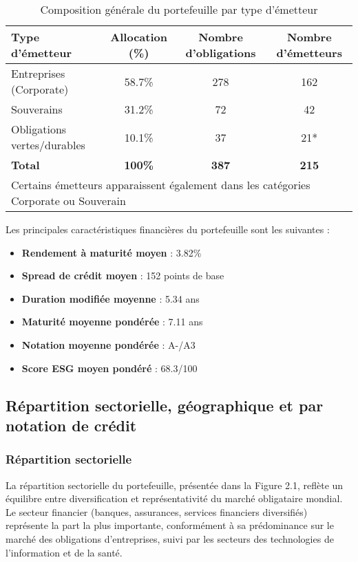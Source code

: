 \begin{table}[h]
\centering
\caption{Composition générale du portefeuille par type d'émetteur}
\begin{tabular}{lccc}
\hline
\textbf{Type d'émetteur} & \textbf{Allocation (\%)} & \textbf{Nombre d'obligations} & \textbf{Nombre d'émetteurs} \\
\hline
Entreprises (Corporate) & 58.7\% & 278 & 162 \\
Souverains & 31.2\% & 72 & 42 \\
Obligations vertes/durables & 10.1\% & 37 & 21* \\
\hline
\textbf{Total} & \textbf{100\%} & \textbf{387} & \textbf{215} \\
\hline
\multicolumn{4}{l}{\small *Certains émetteurs apparaissent également dans les catégories Corporate ou Souverain} \\
\end{tabular}
\end{table}

Les principales caractéristiques financières du portefeuille sont les suivantes :

\begin{itemize}
    \item \textbf{Rendement à maturité moyen} : 3.82\%
    \item \textbf{Spread de crédit moyen} : 152 points de base
    \item \textbf{Duration modifiée moyenne} : 5.34 ans
    \item \textbf{Maturité moyenne pondérée} : 7.11 ans
    \item \textbf{Notation moyenne pondérée} : A-/A3
    \item \textbf{Score ESG moyen pondéré} : 68.3/100
\end{itemize}

\subsection{Répartition sectorielle, géographique et par notation de crédit}

\subsubsection{Répartition sectorielle}

La répartition sectorielle du portefeuille, présentée dans la Figure 2.1, reflète un équilibre entre diversification et représentativité du marché obligataire mondial. Le secteur financier (banques, assurances, services financiers diversifiés) représente la part la plus importante, conformément à sa prédominance sur le marché des obligations d'entreprises, suivi par les secteurs des technologies de l'information et de la santé.

